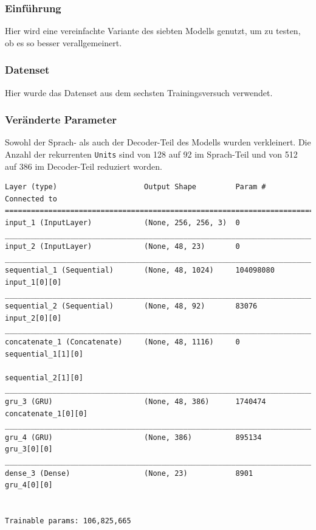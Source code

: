 \documentclass[pdftex,a4paper,halfparskip, article]{scrartcl}
\begin{document}

\subsubsection*{Einführung}

Hier wird eine vereinfachte Variante des siebten Modells genutzt, um zu testen, ob es so besser verallgemeinert.

\subsubsection*{Datenset}

Hier wurde das Datenset aus dem sechsten Trainingsversuch verwendet.

\subsubsection*{Veränderte Parameter}

Sowohl der Sprach- als auch der Decoder-Teil des Modells wurden verkleinert. Die Anzahl der rekurrenten \texttt{Units} sind von 128 auf 92 im Sprach-Teil und von 512 auf 386 im Decoder-Teil reduziert worden.

\begin{verbatim}
Layer (type)                    Output Shape         Param #     Connected to
=============================================================================
input_1 (InputLayer)            (None, 256, 256, 3)  0
_____________________________________________________________________________
input_2 (InputLayer)            (None, 48, 23)       0
_____________________________________________________________________________
sequential_1 (Sequential)       (None, 48, 1024)     104098080   input_1[0][0]
_____________________________________________________________________________
sequential_2 (Sequential)       (None, 48, 92)       83076       input_2[0][0]
_____________________________________________________________________________
concatenate_1 (Concatenate)     (None, 48, 1116)     0           sequential_1[1][0]
                                                                 sequential_2[1][0]
_____________________________________________________________________________
gru_3 (GRU)                     (None, 48, 386)      1740474     concatenate_1[0][0]
_____________________________________________________________________________
gru_4 (GRU)                     (None, 386)          895134      gru_3[0][0]
_____________________________________________________________________________
dense_3 (Dense)                 (None, 23)           8901        gru_4[0][0]


Trainable params: 106,825,665
\end{verbatim}
\end{document}
